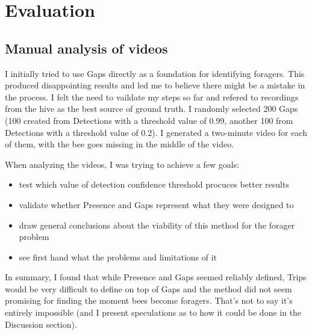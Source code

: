 
\chapter{Evaluation}  %

\ifpdf
    \graphicspath{{Chapters/Chapter4/Figs/Raster/}{Chapters/Chapter4/Figs/PDF/}{Chapters/Chapter4/Figs/}}
\else
    \graphicspath{{Chapters/Chapter4/Figs/Vector/}{Chapters/Chapter4/Figs/}}
\fi


\section{Manual analysis of videos}

I initially tried to use Gaps directly as a foundation for identifying foragers. This produced disappointing results and led me to believe there might be a mistake in the process. I felt the need to vaildate my steps so far and refered to recordings from the hive as the best source of ground truth. I randomly selected 200 Gaps (100 created from Detections with a threshold value of 0.99, another 100 from Detections with a threshold value of 0.2). I generated a two-minute video for each of them, with the bee goes missing in the middle of the video. 


When analyzing the videos, I was trying to achieve a few goals:
\begin{itemize}
\item test which value of detection confidence threshold procuces better results
\item validate whether Presence and Gaps represent what they were designed to
\item draw general conclusions about the viability of this method for the forager problem
\item see first hand what the problems and limitations of it 
\end{itemize}

In summary, I found that while Presence and Gaps seemed reliably defined, Trips would be very difficult to define on top of Gaps and the method did not seem promising for finding the moment bees become foragers. 
That’s not to say it’s entirely impossible (and I present speculations as to how it could be done in the Discussion section).


